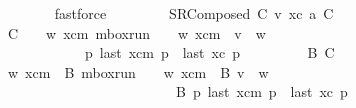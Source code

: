 \begin{isabellebody}
\ \ \ \ \ \ \isamarkupfalse%
\ fastforce\isanewline
\ \ \isamarkupfalse%
\isanewline
\ \ \ \ \isamarkupfalse%
\ {\isacharparenleft}{\kern0pt}SRComposed\ C{}\ v\ xc\ a\ C{\isacharparenright}{\kern0pt}\isanewline
\ \ \ \ \isamarkupfalse%
\ {\isachardoublequoteopen}C{}\ {\isacharequal}{\kern0pt}\ {\isasymC}\isactrlsub {\isasymI}\isactrlsub {\isasymzero}\ {\isasymLongrightarrow}\ {\isasymexists}w\ xcm{\isachardot}{\kern0pt}\ mbox{\isacharunderscore}{\kern0pt}run\ {\isasymC}\isactrlsub {\isasymI}\isactrlsub {\isasymmm}\ {\isacharparenleft}{\kern0pt}{\isasymB}\ {}{\isacharparenright}{\kern0pt}\ w\ xcm\ {\isasymand}\ v\ {\isacharequal}{\kern0pt}\ w{\isasymdown}\isactrlsub {\isacharbang}{\kern0pt}\ {\isasymand}\isanewline
\ \ \ \ \ \ \ \ \ \ \ \ {\isacharparenleft}{\kern0pt}{\isasymforall}p{\isachardot}{\kern0pt}\ last\ {\isacharparenleft}{\kern0pt}{\isasymC}\isactrlsub {\isasymI}\isactrlsub {\isasymmm}{\isacharhash}{\kern0pt}xcm{\isacharparenright}{\kern0pt}\ p\ {\isacharequal}{\kern0pt}\ {\isacharparenleft}{\kern0pt}last\ {\isacharparenleft}{\kern0pt}{\isasymC}\isactrlsub {\isasymI}\isactrlsub {\isasymzero}{\isacharhash}{\kern0pt}xc{\isacharparenright}{\kern0pt}\ p{\isacharcomma}{\kern0pt}\ {\isasymepsilon}{\isacharparenright}{\kern0pt}{\isacharparenright}{\kern0pt}{\isachardoublequoteclose}\isanewline
\ \ \ \ \ \ \ \ B{}{\isacharcolon}{\kern0pt}\ {\isachardoublequoteopen}C{}\ {\isacharequal}{\kern0pt}\ {\isasymC}\isactrlsub {\isasymI}\isactrlsub {\isasymzero}{\isachardoublequoteclose}\isanewline
\ \ \ \ \isamarkupfalse%
\ \isamarkupfalse%
\ w\ xcm\ \ B{}{\isacharcolon}{\kern0pt}\ {\isachardoublequoteopen}mbox{\isacharunderscore}{\kern0pt}run\ {\isasymC}\isactrlsub {\isasymI}\isactrlsub {\isasymmm}\ {\isacharparenleft}{\kern0pt}{\isasymB}\ {}{\isacharparenright}{\kern0pt}\ w\ xcm{\isachardoublequoteclose}\ \ B{}{\isacharcolon}{\kern0pt}\ {\isachardoublequoteopen}v\ {\isacharequal}{\kern0pt}\ w{\isasymdown}\isactrlsub {\isacharbang}{\kern0pt}{\isachardoublequoteclose}\isanewline
\ \ \ \ \ \ \ \ \ \ \ \ \ \ \ \ \ \ \ \ \ \ \ \ \ B{}{\isacharcolon}{\kern0pt}\ {\isachardoublequoteopen}{\isasymforall}p{\isachardot}{\kern0pt}\ last\ {\isacharparenleft}{\kern0pt}{\isasymC}\isactrlsub {\isasymI}\isactrlsub {\isasymmm}{\isacharhash}{\kern0pt}xcm{\isacharparenright}{\kern0pt}\ p\ {\isacharequal}{\kern0pt}\ {\isacharparenleft}{\kern0pt}last\ {\isacharparenleft}{\kern0pt}{\isasymC}\isactrlsub {\isasymI}\isactrlsub {\isasymzero}{\isacharhash}{\kern0pt}xc{\isacharparenright}{\kern0pt}\ p{\isacharcomma}{\kern0pt}\ {\isasymepsilon}{\isacharparenright}{\kern0pt}{\isachardoublequoteclose}\isanewline

\end{isabellebody}
